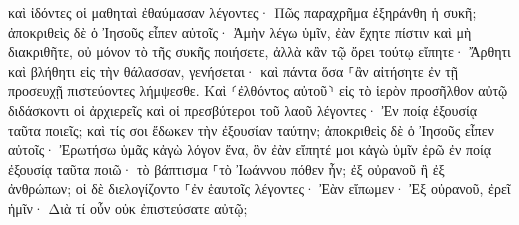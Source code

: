 \documentclass{openreader}
\begin{document}
καὶ ἰδόντες οἱ μαθηταὶ ἐθαύμασαν λέγοντες· Πῶς παραχρῆμα ἐξηράνθη ἡ συκῆ; 
ἀποκριθεὶς δὲ ὁ Ἰησοῦς εἶπεν αὐτοῖς· Ἀμὴν λέγω ὑμῖν, ἐὰν ἔχητε πίστιν καὶ μὴ διακριθῆτε, οὐ μόνον τὸ τῆς συκῆς ποιήσετε, ἀλλὰ κἂν τῷ ὄρει τούτῳ εἴπητε· Ἄρθητι καὶ βλήθητι εἰς τὴν θάλασσαν, γενήσεται· 
καὶ πάντα ὅσα ⸀ἂν αἰτήσητε ἐν τῇ προσευχῇ πιστεύοντες λήμψεσθε. 
Καὶ ⸂ἐλθόντος αὐτοῦ⸃ εἰς τὸ ἱερὸν προσῆλθον αὐτῷ διδάσκοντι οἱ ἀρχιερεῖς καὶ οἱ πρεσβύτεροι τοῦ λαοῦ λέγοντες· Ἐν ποίᾳ ἐξουσίᾳ ταῦτα ποιεῖς; καὶ τίς σοι ἔδωκεν τὴν ἐξουσίαν ταύτην; 
ἀποκριθεὶς δὲ ὁ Ἰησοῦς εἶπεν αὐτοῖς· Ἐρωτήσω ὑμᾶς κἀγὼ λόγον ἕνα, ὃν ἐὰν εἴπητέ μοι κἀγὼ ὑμῖν ἐρῶ ἐν ποίᾳ ἐξουσίᾳ ταῦτα ποιῶ· 
τὸ βάπτισμα ⸀τὸ Ἰωάννου πόθεν ἦν; ἐξ οὐρανοῦ ἢ ἐξ ἀνθρώπων; οἱ δὲ διελογίζοντο ⸀ἐν ἑαυτοῖς λέγοντες· Ἐὰν εἴπωμεν· Ἐξ οὐρανοῦ, ἐρεῖ ἡμῖν· Διὰ τί οὖν οὐκ ἐπιστεύσατε αὐτῷ; 
\end{document}
